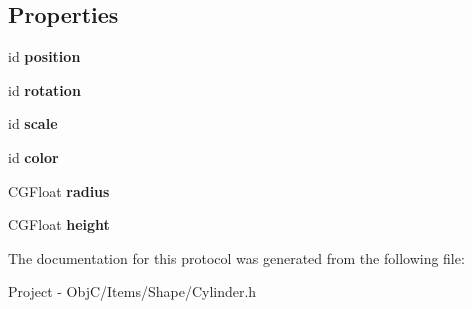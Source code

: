 \subsection*{Properties}
\begin{DoxyCompactItemize}
\item 
\hypertarget{protocol_cylinder_export-p_ac2867f572da0633af81024a0aa919fc3}{}id {\bfseries position}\label{protocol_cylinder_export-p_ac2867f572da0633af81024a0aa919fc3}

\item 
\hypertarget{protocol_cylinder_export-p_a561b672213acedb208a27aa8425a5e8a}{}id {\bfseries rotation}\label{protocol_cylinder_export-p_a561b672213acedb208a27aa8425a5e8a}

\item 
\hypertarget{protocol_cylinder_export-p_a055a8720c915b4984bac8b1976924a8d}{}id {\bfseries scale}\label{protocol_cylinder_export-p_a055a8720c915b4984bac8b1976924a8d}

\item 
\hypertarget{protocol_cylinder_export-p_ae3d1b0f218f4c938a10db5a5efc8eb55}{}id {\bfseries color}\label{protocol_cylinder_export-p_ae3d1b0f218f4c938a10db5a5efc8eb55}

\item 
\hypertarget{protocol_cylinder_export-p_aadc19e4c83b90f15eea33277ccddb29e}{}C\+G\+Float {\bfseries radius}\label{protocol_cylinder_export-p_aadc19e4c83b90f15eea33277ccddb29e}

\item 
\hypertarget{protocol_cylinder_export-p_a7f7d9c5d40dd25ba44b2e9525fe12ba6}{}C\+G\+Float {\bfseries height}\label{protocol_cylinder_export-p_a7f7d9c5d40dd25ba44b2e9525fe12ba6}

\end{DoxyCompactItemize}


The documentation for this protocol was generated from the following file\+:\begin{DoxyCompactItemize}
\item 
Project -\/ Obj\+C/\+Items/\+Shape/Cylinder.\+h\end{DoxyCompactItemize}
